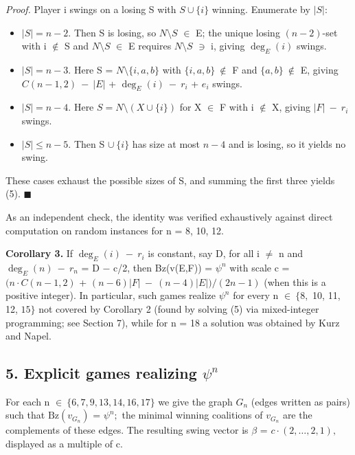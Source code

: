 \documentclass[
]{article}
\providecommand{\tightlist}{%
  \setlength{\itemsep}{0pt}\setlength{\parskip}{0pt}}
\begin{document}
\emph{Proof.} Player i swings on a losing S with \(S\cup\{i\}\) winning.
Enumerate by \(|S|\):

\begin{itemize}
\tightlist
\item
  \(|S| = n-2\). Then S is losing, so \(N\setminus S\) \(\in\) E; the
  unique losing \((n-2)\)-set with i \(\notin\) S and \(N\setminus S\)
  \(\in\) E requires \(N\setminus S\) \(\ni\) i, giving \(\deg_E(i)\)
  swings.
\item
  \(|S| = n-3\). Here S = \(N\setminus\{i,a,b\}\) with
  \(\{i,a,b\}\ \notin\) F and \(\{a,b\}\ \notin\) E, giving
  \(C(n-1,2)\ -\ \vert E\vert\) + \(\deg_E(i)\ -\ r_i\) + \(e_i\)
  swings.
\item
  \(|S| = n-4\). Here \(S = N \setminus (X \cup \{i\})\) for X \(\in\) F
  with i \(\notin\) X, giving \(\vert F\vert\ -\ r_i\) swings.
\item
  \(|S| \le n-5\). Then S \(\cup\ \{i\}\) has size at most \(n-4\) and
  is losing, so it yields no swing.
\end{itemize}

These cases exhaust the possible sizes of S, and summing the first three
yields (5). \(\blacksquare\)

As an independent check, the identity was verified exhaustively against
direct computation on random instances for n = 8, 10, 12.

\textbf{Corollary 3.} If \(\deg_E(i)\ -\ r_i\) is constant, say D, for
all i \(\ne\) n and \(\deg_E(n)\ -\ r_n\) = D \(-\) c/2, then Bz(v(E,F))
= \(\psi^n\) with scale c = \((n\cdot C(n-1,2)\) +
\((n-6)\vert F\vert\ -\ (n-4)\vert E\vert)/(2n-1)\) (when this is a
positive integer). In particular, such games realize \(\psi^n\) for
every n \(\in\ \{8,\) 10, 11, 12, \(15\}\) not covered by Corollary 2
(found by solving (5) via mixed-integer programming; see Section 7),
while for n = 18 a solution was obtained by Kurz and Napel.

\subsection{\texorpdfstring{5. Explicit games realizing
\(\psi^n\)}{5. Explicit games realizing \textbackslash psi\^{}n}}\label{explicit-games-realizing-ux3c8ux207f}

For each n \(\in\ \{6,7,9,13,14,16,17\}\) we give the graph \(G_n\)
(edges written as pairs) such that \(\mathrm{Bz}(v_{G_n})\) =
\(\psi^n;\) the minimal winning coalitions of \(v_{G_n}\) are the
complements of these edges. The resulting swing vector is \(\beta\) =
\(c\cdot(2,\dots,2,1),\) displayed as a multiple of c.
\end{document}
